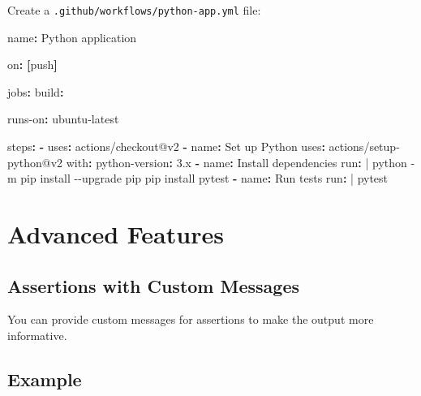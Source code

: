 \documentclass[
  letterpaper,
  DIV=11,
  numbers=noendperiod]{scrreprt}
\newenvironment{Shaded}{\begin{snugshade}}{\end{snugshade}}
\newcommand{\AttributeTok}[1]{\textcolor[rgb]{0.40,0.45,0.13}{#1}}
\newcommand{\CharTok}[1]{\textcolor[rgb]{0.13,0.47,0.30}{#1}}
\newcommand{\FunctionTok}[1]{\textcolor[rgb]{0.28,0.35,0.67}{#1}}
\newcommand{\KeywordTok}[1]{\textcolor[rgb]{0.00,0.23,0.31}{\textbf{#1}}}
\newcommand{\NormalTok}[1]{\textcolor[rgb]{0.00,0.23,0.31}{#1}}
\newcommand{\StringTok}[1]{\textcolor[rgb]{0.13,0.47,0.30}{#1}}
\begin{document}
Create a \texttt{.github/workflows/python-app.yml} file:

\begin{Shaded}
\begin{Highlighting}[]
\FunctionTok{name}\KeywordTok{:}\AttributeTok{ Python application}

\FunctionTok{on}\KeywordTok{:}\AttributeTok{ }\KeywordTok{[}\AttributeTok{push}\KeywordTok{]}

\FunctionTok{jobs}\KeywordTok{:}
\AttributeTok{  }\FunctionTok{build}\KeywordTok{:}

\AttributeTok{    }\FunctionTok{runs{-}on}\KeywordTok{:}\AttributeTok{ ubuntu{-}latest}

\AttributeTok{    }\FunctionTok{steps}\KeywordTok{:}
\AttributeTok{    }\KeywordTok{{-}}\AttributeTok{ }\FunctionTok{uses}\KeywordTok{:}\AttributeTok{ actions/checkout@v2}
\AttributeTok{    }\KeywordTok{{-}}\AttributeTok{ }\FunctionTok{name}\KeywordTok{:}\AttributeTok{ Set up Python}
\AttributeTok{      }\FunctionTok{uses}\KeywordTok{:}\AttributeTok{ actions/setup{-}python@v2}
\AttributeTok{      }\FunctionTok{with}\KeywordTok{:}
\AttributeTok{        }\FunctionTok{python{-}version}\KeywordTok{:}\AttributeTok{ }\StringTok{\textquotesingle{}3.x\textquotesingle{}}
\AttributeTok{    }\KeywordTok{{-}}\AttributeTok{ }\FunctionTok{name}\KeywordTok{:}\AttributeTok{ Install dependencies}
\FunctionTok{      run}\KeywordTok{: }\CharTok{|}
\NormalTok{        python {-}m pip install {-}{-}upgrade pip}
\NormalTok{        pip install pytest}
\AttributeTok{    }\KeywordTok{{-}}\AttributeTok{ }\FunctionTok{name}\KeywordTok{:}\AttributeTok{ Run tests}
\FunctionTok{      run}\KeywordTok{: }\CharTok{|}
\NormalTok{        pytest}
\end{Highlighting}
\end{Shaded}

\section{Advanced Features}\label{advanced-features}

\subsection{Assertions with Custom
Messages}\label{assertions-with-custom-messages}

You can provide custom messages for assertions to make the output more
informative.

\subsection{Example}\label{example-27}
\end{document}
